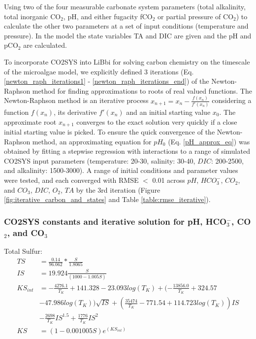 \documentclass{ruthesis}
\begin{document}
Using two of the four measurable carbonate system parameters (total alkalinity, total inorganic CO$_2$, pH, and either fugacity fCO$_2$ or partial pressure of CO$_2$) to calculate the other two parameters at a set of input conditions (temperature and pressure).  In the model the state variables TA and DIC are given and the pH and pCO$_2$ are calculated. 



To incorporate CO2SYS into LiBbi for solving carbon chemistry on the timescale of the microalgae model, we explicitly defined 3 iterations (Eq. \ref{newton_raph_iterations1} - \ref{newton_raph_iterations_end}) of the Newton-Raphson method for finding approximations to roots of real valued functions. The Newton-Raphson method is an iterative process 
$ x_{n+1} = x_n - \frac{f(x_n)}{f'(x_n)} $
considering a function $f(x_n)$, its derivative $f'(x_n)$ and an initial starting value $x_0$. The approximate root $x_{n+1}$ converges to the exact solution very quickly if a close initial starting value is picked. To ensure the quick convergence of the Newton-Raphson method, an approximating equation for $pH_0$ (Eq. \ref{pH_approx_eq}) was obtained by fitting a stepwise regression with interactions to a range of simulated CO2SYS input parameters (temperature: 20-30, salinity: 30-40, $DIC$: 200-2500, and alkalinity: 1500-3000). A range of initial conditions and parameter values were tested, and each converged with RMSE $<$ 0.01 across $pH$, $HCO_3^-$, $CO_2$, and $CO_3$, $DIC$, $O_2$, $TA$ by the 3rd iteration (Figure \ref{fig:iterative_carbon_and_states} and Table \ref{table:rmse_iterative}).



\subsubsection{CO2SYS constants and iterative solution for pH, HCO$_3^-$, CO$_2$, and CO$_3$}

Total Sulfur:
\begin{align*}
TS     	&= \frac{0.14}{96.062} * \frac{S}{1.8065} \nonumber \\
IS     	&= 19.924 \frac{S}{(1000 - 1.005 S)} \nonumber \\
KS_{int} 	&= -\frac{4276.1}{T_K} + 141.328 - 23.093 log(T_K) + (-\frac{13856.0}{T_K} + 324.57 \nonumber\\ 			 
& - 47.986 log(T_K)) \sqrt{IS} + ( \frac{35474}{T_K} - 771.54  + 114.723 log(T_K)) IS \nonumber \\
& - \frac{2698}{T_K} IS^{1.5} + \frac{1776}{T_K} IS^2 \nonumber \\
KS     	&=  (1 - 0.001005 S)e^{(KS_{int})} \nonumber 
\end{align*}
\end{document}
